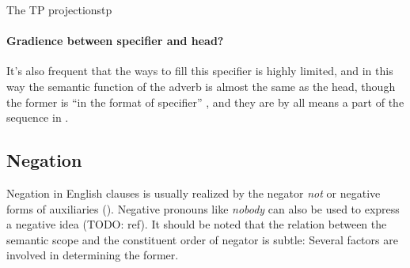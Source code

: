 \documentclass[UTF8, a4paper, oneside, scheme=plain]{ctexrep}
\newcommand{\corpus}[1]{\emph{#1}}
\begin{document}
\begin{theorybox}{The TP projections}{tp}
    \paragraph*{Gradience between specifier and head?} 
    It's also frequent that the ways to fill this specifier is highly limited,
    and in this way the semantic function of the adverb 
    is almost the same as the head, though the former is ``in the format of specifier''
    \citep{shlonsky2010cartographic},
    and they are by all means a part of the sequence in .
\end{theorybox}

\subsection{Negation} 

Negation in English clauses is usually realized by the negator \corpus{not}
or negative forms of auxiliaries (). 
Negative pronouns like \corpus{nobody} can also be used to express a negative idea (TODO: ref).
It should be noted that the relation between the semantic scope and the constituent order of negator 
is subtle:
Several factors are involved in determining the former.
\end{document}
